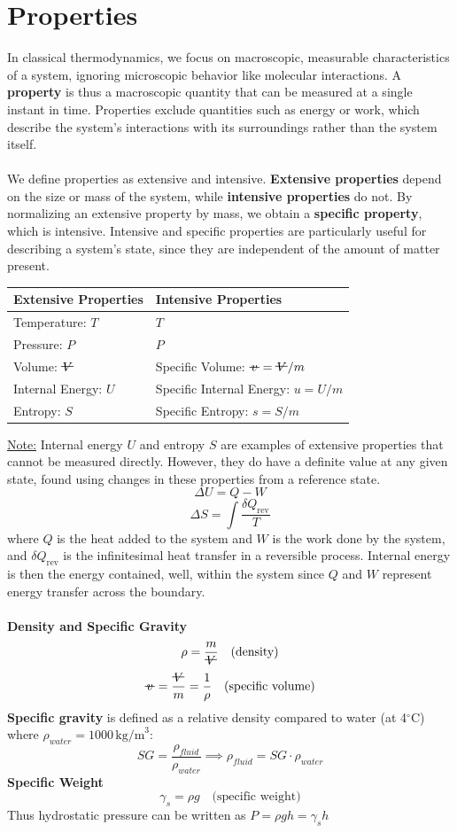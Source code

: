 \documentclass[12pt]{article}
\newcommand{\vol}{\mathord{\text{\ooalign{\hidewidth $V$\hidewidth\cr\kern-0.5pt\raisebox{0.8ex}{\rule[0pt]{1em}{0.5pt}}}}}}
\newcommand{\svol}{%
  \mathord{\ooalign{%
    \hfil$v$\hfil\cr
    \hfil\rule[0.6ex]{0.8em}{0.5pt}\hfil
  }}%
}
\begin{document}
\section*{Properties}
In classical thermodynamics, we focus on macroscopic, measurable characteristics of a system, ignoring microscopic behavior like molecular interactions. A \textbf{property} is thus a macroscopic quantity that can be measured at a single instant in time. Properties exclude quantities such as energy or work, which describe the system’s interactions with its surroundings rather than the system itself.\\\\
We define properties as extensive and intensive. \textbf{Extensive properties} depend on the size or mass of the system, while \textbf{intensive properties} do not. By normalizing an extensive property by mass, we obtain a \textbf{specific property}, which is intensive. Intensive and specific properties are particularly useful for describing a system’s state, since they are independent of the amount of matter present.
\begin{center}
\begin{tabular}{|l|l|}
\hline
\textbf{Extensive Properties} & \textbf{Intensive Properties} \\
\hline
Temperature: $T$ & $T$ \\
Pressure: $P$ & $P$ \\
Volume: $\vol$ & Specific Volume: $\svol = \vol / m$ \\
Internal Energy: $U$ & Specific Internal Energy: $u = U / m$ \\
Entropy: $S$ & Specific Entropy: $s = S / m$ \\
\hline
\end{tabular}
\end{center}
\underline{Note:} Internal energy $U$ and entropy $S$ are examples of extensive properties that cannot be measured directly. However, they do have a definite value at any given state, found using changes in these properties from a reference state.
\[\Delta U = Q - W\]  
\[\Delta S = \int \frac{\delta Q_\mathrm{rev}}{T}\]  
where $Q$ is the heat added to the system and $W$ is the work done by the system, and $\delta Q_\mathrm{rev}$ is the infinitesimal heat transfer in a reversible process. Internal energy is then the energy contained, well, within the system since $Q$ and $W$ represent energy transfer across the boundary.\\\\
\textbf{Density and Specific Gravity}
\[\rho = \frac{m}{\vol}\quad \text{(density)}\]
\[\svol = \frac{\vol}{m} = \frac{1}{\rho} \quad \text{(specific volume)}\]
\textbf{Specific gravity} is defined as a relative density compared to water (at 4$^\circ$C) where $\rho_{water} = 1000\,\text{kg/m}^3$:
\[\boxed{SG = \frac{\rho_{fluid}}{\rho_{water}} \implies \rho_{fluid} = SG \cdot \rho_{water}}\]
\textbf{Specific Weight}
\[\gamma_s = \rho g \quad \text{(specific weight)}\]
Thus hydrostatic pressure can be written as $P = \rho gh=\gamma_s h$
\newpage
\end{document}

